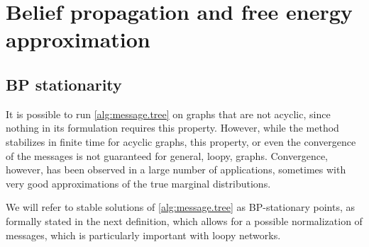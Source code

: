 \section{Belief propagation and free energy approximation}
\subsection{BP stationarity}
It is possible to run \cref{alg:message.tree} on graphs that are not acyclic, since nothing in its formulation requires this property. However, while the method stabilizes in finite time for acyclic graphs, this property, or even the convergence of the messages is not guaranteed for general, loopy, graphs. Convergence, however, has been observed in a large number of applications, sometimes with very good approximations of the true marginal distributions. 


We will refer to stable solutions of \cref{alg:message.tree} as BP-stationary points, as formally stated in the next
definition, which allows for a possible normalization of messages,
which is particularly important with loopy networks. 

